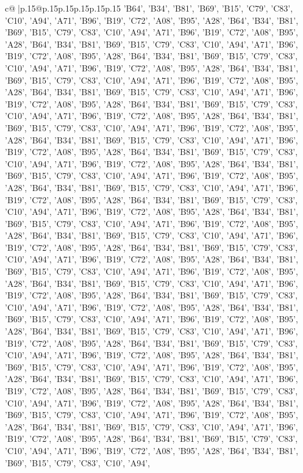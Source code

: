 \documentclass{article}
\begin{document}
{\begin{supertabular}{c@{$\;$}|p{.15\linewidth}@{}p{.15\linewidth}p{.15\linewidth}p{.15\linewidth}p{.15\linewidth}p{.15\linewidth}}
{{{'B64', 'B34', 'B81', 'B69', 'B15', 'C79', 'C83', 'C10', 'A94', 'A71', 'B96', 'B19', 'C72', 'A08', 'B95', 'A28', 'B64', 'B34', 'B81', 'B69', 'B15', 'C79', 'C83', 'C10', 'A94', 'A71', 'B96', 'B19', 'C72', 'A08', 'B95', 'A28', 'B64', 'B34', 'B81', 'B69', 'B15', 'C79', 'C83', 'C10', 'A94', 'A71', 'B96', 'B19', 'C72', 'A08', 'B95', 'A28', 'B64', 'B34', 'B81', 'B69', 'B15', 'C79', 'C83', 'C10', 'A94', 'A71', 'B96', 'B19', 'C72', 'A08', 'B95', 'A28', 'B64', 'B34', 'B81', 'B69', 'B15', 'C79', 'C83', 'C10', 'A94', 'A71', 'B96', 'B19', 'C72', 'A08', 'B95', 'A28', 'B64', 'B34', 'B81', 'B69', 'B15', 'C79', 'C83', 'C10', 'A94', 'A71', 'B96', 'B19', 'C72', 'A08', 'B95', 'A28', 'B64', 'B34', 'B81', 'B69', 'B15', 'C79', 'C83', 'C10', 'A94', 'A71', 'B96', 'B19', 'C72', 'A08', 'B95', 'A28', 'B64', 'B34', 'B81', 'B69', 'B15', 'C79', 'C83', 'C10', 'A94', 'A71', 'B96', 'B19', 'C72', 'A08', 'B95', 'A28', 'B64', 'B34', 'B81', 'B69', 'B15', 'C79', 'C83', 'C10', 'A94', 'A71', 'B96', 'B19', 'C72', 'A08', 'B95', 'A28', 'B64', 'B34', 'B81', 'B69', 'B15', 'C79', 'C83', 'C10', 'A94', 'A71', 'B96', 'B19', 'C72', 'A08', 'B95', 'A28', 'B64', 'B34', 'B81', 'B69', 'B15', 'C79', 'C83', 'C10', 'A94', 'A71', 'B96', 'B19', 'C72', 'A08', 'B95', 'A28', 'B64', 'B34', 'B81', 'B69', 'B15', 'C79', 'C83', 'C10', 'A94', 'A71', 'B96', 'B19', 'C72', 'A08', 'B95', 'A28', 'B64', 'B34', 'B81', 'B69', 'B15', 'C79', 'C83', 'C10', 'A94', 'A71', 'B96', 'B19', 'C72', 'A08', 'B95', 'A28', 'B64', 'B34', 'B81', 'B69', 'B15', 'C79', 'C83', 'C10', 'A94', 'A71', 'B96', 'B19', 'C72', 'A08', 'B95', 'A28', 'B64', 'B34', 'B81', 'B69', 'B15', 'C79', 'C83', 'C10', 'A94', 'A71', 'B96', 'B19', 'C72', 'A08', 'B95', 'A28', 'B64', 'B34', 'B81', 'B69', 'B15', 'C79', 'C83', 'C10', 'A94', 'A71', 'B96', 'B19', 'C72', 'A08', 'B95', 'A28', 'B64', 'B34', 'B81', 'B69', 'B15', 'C79', 'C83', 'C10', 'A94', 'A71', 'B96', 'B19', 'C72', 'A08', 'B95', 'A28', 'B64', 'B34', 'B81', 'B69', 'B15', 'C79', 'C83', 'C10', 'A94', 'A71', 'B96', 'B19', 'C72', 'A08', 'B95', 'A28', 'B64', 'B34', 'B81', 'B69', 'B15', 'C79', 'C83', 'C10', 'A94', 'A71', 'B96', 'B19', 'C72', 'A08', 'B95', 'A28', 'B64', 'B34', 'B81', 'B69', 'B15', 'C79', 'C83', 'C10', 'A94', 'A71', 'B96', 'B19', 'C72', 'A08', 'B95', 'A28', 'B64', 'B34', 'B81', 'B69', 'B15', 'C79', 'C83', 'C10', 'A94', 'A71', 'B96', 'B19', 'C72', 'A08', 'B95', 'A28', 'B64', 'B34', 'B81', 'B69', 'B15', 'C79', 'C83', 'C10', 'A94', 'A71', 'B96', 'B19', 'C72', 'A08', 'B95', 'A28', 'B64', 'B34', 'B81', 'B69', 'B15', 'C79', 'C83', 'C10', 'A94', 'A71', 'B96', 'B19', 'C72', 'A08', 'B95', 'A28', 'B64', 'B34', 'B81', 'B69', 'B15', 'C79', 'C83', 'C10', 'A94', 'A71', 'B96', 'B19', 'C72', 'A08', 'B95', 'A28', 'B64', 'B34', 'B81', 'B69', 'B15', 'C79', 'C83', 'C10', 'A94', 'A71', 'B96', 'B19', 'C72', 'A08', 'B95', 'A28', 'B64', 'B34', 'B81', 'B69', 'B15', 'C79', 'C83', 'C10', 'A94', 'A71', 'B96', 'B19', 'C72', 'A08', 'B95', 'A28', 'B64', 'B34', 'B81', 'B69', 'B15', 'C79', 'C83', 'C10', 'A94', 'A71', 'B96', 'B19', 'C72', 'A08', 'B95', 'A28', 'B64', 'B34', 'B81', 'B69', 'B15', 'C79', 'C83', 'C10', 'A94', 'A71', 'B96', 'B19', 'C72', 'A08', 'B95', 'A28', 'B64', 'B34', 'B81', 'B69', 'B15', 'C79', 'C83', 'C10', 'A94', }}}
\end{supertabular}}
\end{document}
